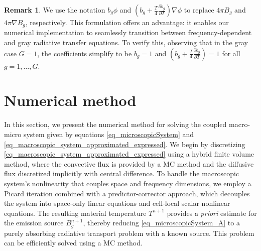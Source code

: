 \documentclass[preprint,12pt]{elsarticle}
\theoremstyle{definition}
\newtheorem{remark}{Remark}[section]
\theoremstyle{plain}
\numberwithin{equation}{section}
\numberwithin{algorithm}{section}
\newcounter{eq_count}
\newcounter{thm_count}
\newcounter{fig_count}
\newcounter{tab_count}
\newcounter{alg_count}
\let\OldSection\section
\renewcommand{\section}{
    \setcounter{eq_count}{0}
    \setcounter{thm_count}{0}
    \setcounter{fig_count}{0}
    \setcounter{tab_count}{0}
    \setcounter{alg_count}{0}
    \OldSection
}
\newcommand{\vOmega}{\mathbf{\Omega}}
\newcommand{\vx}{\mathbf{x}}
\newcommand{\mfx}{{\mathbf{X}}}
\newcommand{\dd}{{\text{d}}}
\newcommand{\pdrv}[2]{\frac{\partial{#1}}{\partial{#2}}}
\begin{document}

    \begin{remark} \label{rk_reformulation}
        We use the notation $b_g \phi$ and $(b_g + \frac{T}{4} \pdrv{b_g}{T}) \nabla \phi$ to replace $4 \pi B_g$ and $4 \pi \nabla B_g$, respectively. This formulation offers an advantage: it enables our numerical implementation to seamlessly transition between frequency-dependent and gray radiative transfer equations. To verify this, observing that in the gray case $G =1$, the coefficients simplify to be $b_g = 1$ and $(b_g + \frac{T}{4} \pdrv{b_g}{T}) = 1$ for all $g=1,\ldots,G$. %
    \end{remark}

\section{Numerical method}
\label{sec:method}
In this section, we present the numerical method for solving the coupled macro-micro system given by equations \eqref{eq_microscopicSystem} and \eqref{eq_macroscopic_system_approximated_expressed}. We begin by discretizing \eqref{eq_macroscopic_system_approximated_expressed} using a hybrid finite volume method, where the convective flux  is provided by a MC method and the diffusive flux discretized implicitly with central difference. To handle the macroscopic system's nonlinearity that couples space and frequency dimensions, we employ a Picard iteration combined with a predictor-corrector approach, which decouples the system into space-only linear equations and cell-local scalar nonlinear equations.  The resulting material temperature $T^{n+1}$ provides  a \textit{priori} estimate for the emission source $B_g^{n+1}$, thereby reducing \eqref{eq_microscopicSystem_A} to a purely absorbing radiative transport problem with a known source. This problem can be efficiently solved using a MC method.
\end{document}
